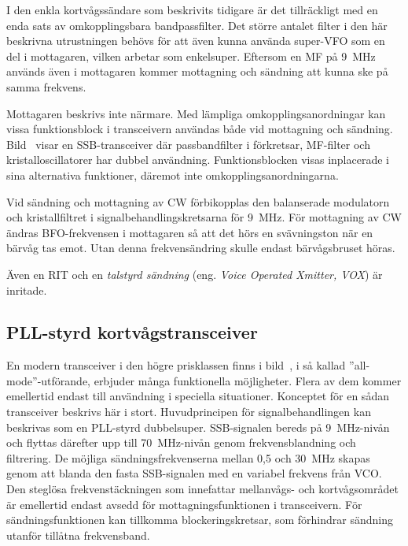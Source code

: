 I den enkla kortvågssändare som beskrivits tidigare är det
tillräckligt med en enda sats av omkopplingsbara bandpassfilter.
Det större antalet filter i den här beskrivna utrustningen behövs för att
även kunna använda super-VFO som en del i mottagaren, vilken arbetar
som enkelsuper.
Eftersom en MF på \qty{9}{\mega\hertz} används även i mottagaren kommer
mottagning och sändning att kunna ske på samma frekvens.

Mottagaren beskrivs inte närmare.
Med lämpliga omkopplingsanordningar kan vissa funktionsblock i
transceivern användas både vid mottagning och sändning.
Bild~ visar en SSB-transceiver där passbandfilter i
förkretsar, MF-filter och kristalloscillatorer har dubbel användning.
Funktionsblocken visas inplacerade i sina alternativa
funktioner, däremot inte omkopplingsanordningarna.

Vid sändning och mottagning av CW förbikopplas den balanserade modulatorn och
kristallfiltret i signalbehandlingskretsarna för \qty{9}{\mega\hertz}.
För mottagning av CW ändras BFO-frekvensen i mottagaren så att
det hörs en svävningston när en bärvåg tas emot.
Utan denna frekvensändring skulle endast bärvågsbruset höras.

Även en RIT och en \emph{talstyrd sändning} (eng.
\emph{Voice Operated Xmitter, VOX}) är inritade.


\newpage
{}

\subsection{PLL-styrd kortvågstransceiver}

En modern transceiver i den högre prisklassen finns i bild~,
i så kallad ''all-mode''-utförande, erbjuder många funktionella möjligheter.
Flera av dem kommer emellertid endast till användning i speciella situationer.
Konceptet för en sådan transceiver beskrivs här i stort.
Huvudprincipen för signalbehandlingen kan beskrivas som en PLL-styrd
dubbelsuper.
SSB-signalen bereds på \qty{9}{\mega\hertz}-nivån och flyttas därefter upp till
\qty{70}{\mega\hertz}-nivån genom frekvensblandning och filtrering.
De möjliga sändningsfrekvenserna mellan 0,5 och \qty{30}{\mega\hertz} skapas
genom att blanda den fasta SSB-signalen med en variabel frekvens från VCO.
Den steglösa frekvenstäckningen som innefattar mellanvågs- och kortvågsområdet
är emellertid endast avsedd för mottagningsfunktionen i transceivern.
För sändningsfunktionen kan tillkomma blockeringskretsar, som förhindrar
sändning utanför tillåtna frekvensband.

